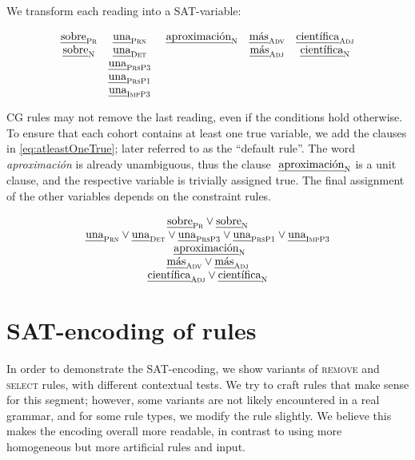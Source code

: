 \noindent We transform each reading into a SAT-variable:

\begin{equation}
\begin{array}{c c c c c}
\sobrePr & \unaPrn & \aproximacionN & \masAdv & \cientificaAdj \\
\sobreN  & \unaDet &                & \masAdj & \cientificaN \\
         & \unaPrsPThree \\
         & \unaPrsPOne \\
         & \unaImp \\
\end{array}
\end{equation}

CG rules may not remove the last reading, even if the conditions hold otherwise.
To ensure that each cohort contains at least one true variable, we add the clauses in \ref{eq:atleastOneTrue}; later referred to as the ``default rule''. 
The word \emph{aproximación} is already unambiguous, thus the clause $\text{ \em aproximaci\'{o}n}_{\text{\sc N}}$ is a unit clause, and the respective variable is trivially assigned true. 
The final assignment of the other variables depends on the constraint rules.


\begin{equation}
\begin{array}{c}
\sobrePr \vee \sobreN \\
\unaPrn \vee \unaDet \vee \unaPrsPThree \vee \unaPrsPOne \vee \unaImp \\
\aproximacionN \\
\masAdv \vee \masAdj \\
\cientificaAdj \vee \cientificaN \\
\end{array}
\label{eq:atleastOneTrue}
\end{equation}


\section{SAT-encoding of rules}
\label{appendix1}

In order to demonstrate the SAT-encoding, we show variants of \textsc{remove} and \textsc{select} rules, with different contextual tests. 
We try to craft rules that make sense for this segment; however, some variants are not likely encountered in a real grammar, and for some rule types, we modify the rule slightly. We believe this makes the encoding overall more readable, in contrast to using more homogeneous but more artificial rules and input.

